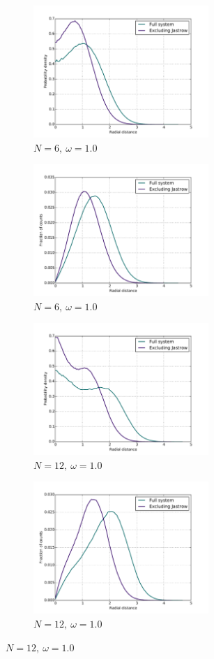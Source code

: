 \documentclass[english, a4paper]{article}
\begin{document}
\begin{figure}[H]
	\begin{subfigure}{0.5\textwidth}
		\includegraphics[width=\textwidth, height= 5cm]{figures/radialDistribution/OneBodyDensityN6w100Se7.pdf}
		\caption{$N=6,\:\omega=1.0$}
	\end{subfigure}
	\begin{subfigure}{0.5\textwidth}
		\includegraphics[width=\textwidth, height= 5cm]{figures/radialDistribution/radialDistributionN6w100Se7.pdf}
		\caption{$N=6,\:\omega=1.0$}
	\end{subfigure}
	
	\vspace{1mm}
	
	\begin{subfigure}{0.5\textwidth}
		\includegraphics[width=\textwidth, height=5cm]{figures/radialDistribution/OneBodyDensityN12w100Se7.pdf}
		\caption{$N=12,\:\omega=1.0$}
	\end{subfigure}
	\begin{subfigure}{0.5\textwidth}
		\includegraphics[width=\textwidth, height= 5cm]{figures/radialDistribution/radialDistributionN12w100Se7.pdf}
		\caption{$N=12,\:\omega=1.0$}
	\end{subfigure}
	

\end{figure}
\end{document}
